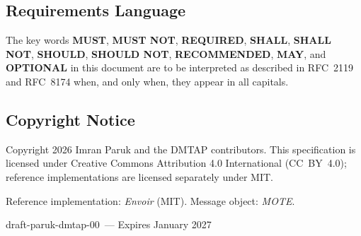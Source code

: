 \documentclass[11pt]{article}
\newcommand{\jobIDname}{draft-paruk-dmtap-00}
\newcommand{\jobIDexpiry}{January 2027}
\begin{document}
\subsection*{Requirements Language}
{\small The key words \textbf{MUST}, \textbf{MUST NOT}, \textbf{REQUIRED},
\textbf{SHALL}, \textbf{SHALL NOT}, \textbf{SHOULD}, \textbf{SHOULD NOT},
\textbf{RECOMMENDED}, \textbf{MAY}, and \textbf{OPTIONAL} in this document are to be
interpreted as described in RFC~2119 and RFC~8174 when, and only when, they appear in
all capitals.}

\subsection*{Copyright Notice}
{\small Copyright \textcopyright{} 2026 Imran Paruk and the DMTAP contributors. This
specification is licensed under Creative Commons Attribution 4.0 International
(CC~BY~4.0); reference implementations are licensed separately under MIT.}

\vfill
\begin{center}\small\color{faintGray}
Reference implementation: \emph{Envoir} (MIT). \quad Message object: \emph{MOTE}.
\end{center}
\clearpage

{\hypersetup{linkcolor=inkGray}
\renewcommand{\contentsname}{\color{inkGray}Table of Contents}
\tableofcontents}
\clearpage
























\vfill
\begin{center}\small\color{faintGray}\jobIDname\ --- Expires \jobIDexpiry\end{center}
\end{document}
